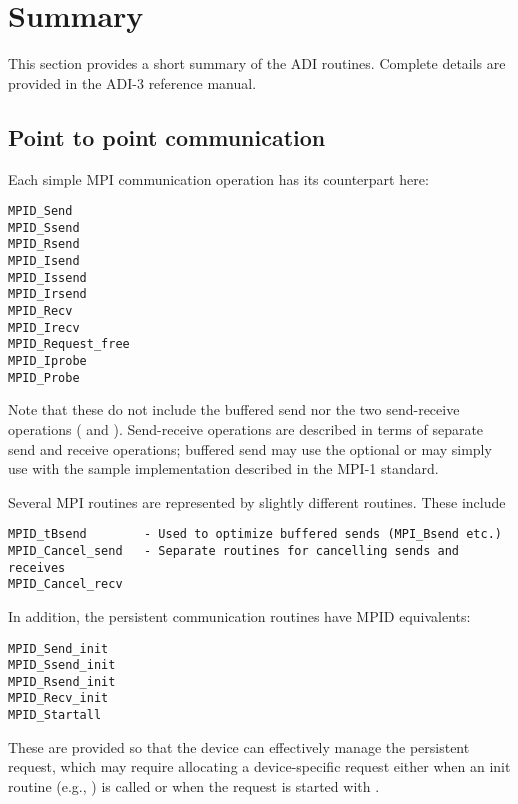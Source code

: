 {%



\section{Summary}
\label{sec:adi-summary}
This section provides a short summary of the ADI routines.  Complete details
are provided in the ADI-3 reference manual.

\subsection{Point to point communication}
Each simple MPI communication operation has its counterpart here:
\begin{verbatim}
MPID_Send
MPID_Ssend
MPID_Rsend
MPID_Isend
MPID_Issend
MPID_Irsend
MPID_Recv
MPID_Irecv
MPID_Request_free
MPID_Iprobe
MPID_Probe
\end{verbatim}
Note that these do not include the buffered send nor the two send-receive
operations ( and ).
Send-receive operations are described in terms of separate send and receive
operations; buffered send may use the optional  or may
simply use  with the sample implementation described in the
MPI-1 standard.

Several MPI routines are represented by slightly different routines.
These include 
\begin{verbatim}
MPID_tBsend        - Used to optimize buffered sends (MPI_Bsend etc.)
MPID_Cancel_send   - Separate routines for cancelling sends and receives
MPID_Cancel_recv
\end{verbatim}

In addition, the persistent communication routines have MPID equivalents:
\begin{verbatim}
MPID_Send_init
MPID_Ssend_init
MPID_Rsend_init
MPID_Recv_init
MPID_Startall
\end{verbatim}
These are provided so that the device can effectively manage the
persistent request, which may require allocating a device-specific
request either when an init routine (e.g., ) is
called or when the request is started with .  

}
